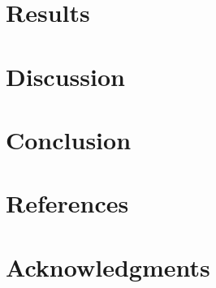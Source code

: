\documentclass[conference]{IEEEtran}
\begin{document}
\section{Results}\label{sec:results}
\section{Discussion}\label{sec:discussions}
\section{Conclusion}\label{sec:conclusions}
\section{References}



\section*{Acknowledgments}




\end{document}
